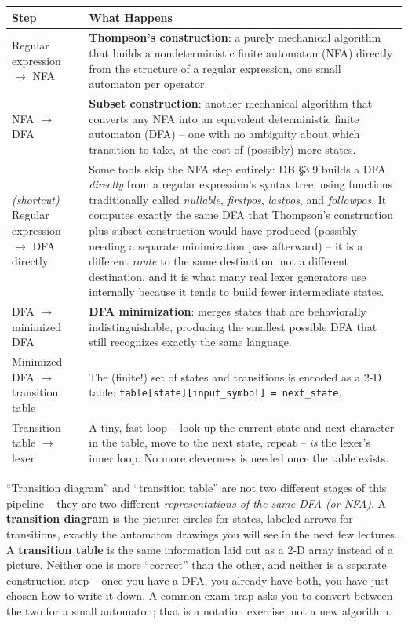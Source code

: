 \documentclass[full-course-notes.tex]{subfiles}
\begin{document}
\begin{center}
\renewcommand{\arraystretch}{1.35}
\begin{tabularx}{\textwidth}{@{}l X@{}}
\toprule
\textbf{Step} & \textbf{What Happens} \\
\midrule
Regular expression $\to$ NFA & \textbf{Thompson's construction}: a purely mechanical algorithm
that builds a nondeterministic finite automaton (NFA) directly from the structure of a regular
expression, one small automaton per operator. \\
NFA $\to$ DFA & \textbf{Subset construction}: another mechanical algorithm that converts any NFA
into an equivalent deterministic finite automaton (DFA) -- one with no ambiguity about which
transition to take, at the cost of (possibly) more states. \\
\emph{(shortcut)} Regular expression $\to$ DFA directly & Some tools skip the NFA step
entirely: DB \S3.9 builds a DFA \emph{directly} from a regular expression's syntax tree, using
functions traditionally called \textit{nullable}, \textit{firstpos}, \textit{lastpos}, and
\textit{followpos}. It computes exactly the same DFA that Thompson's construction plus subset
construction would have produced (possibly needing a separate minimization pass afterward) --
it is a different \emph{route} to the same destination, not a different destination, and it is
what many real lexer generators use internally because it tends to build fewer intermediate
states. \\
DFA $\to$ minimized DFA & \textbf{DFA minimization}: merges states that are behaviorally
indistinguishable, producing the smallest possible DFA that still recognizes exactly the same
language. \\
Minimized DFA $\to$ transition table & The (finite!) set of states and transitions is encoded
as a 2-D table: \texttt{table[state][input\_symbol] = next\_state}. \\
Transition table $\to$ lexer & A tiny, fast loop -- look up the current state and next
character in the table, move to the next state, repeat -- \emph{is} the lexer's inner loop. No
more cleverness is needed once the table exists. \\
\bottomrule
\end{tabularx}
\end{center}

\begin{examfocus}
``Transition diagram'' and ``transition table'' are not two different stages of this pipeline --
they are two different \emph{representations of the same DFA (or NFA)}. A \textbf{transition
diagram} is the picture: circles for states, labeled arrows for transitions, exactly the
automaton drawings you will see in the next few lectures. A \textbf{transition table} is the
same information laid out as a 2-D array instead of a picture. Neither one is more ``correct''
than the other, and neither is a separate construction step -- once you have a DFA, you already
have both, you have just chosen how to write it down. A common exam trap asks you to convert
between the two for a small automaton; that is a notation exercise, not a new algorithm.
\end{examfocus}
\end{document}
